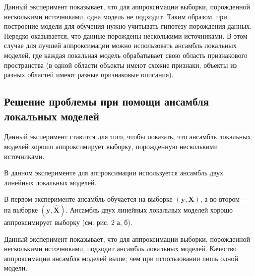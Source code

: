\documentclass[12pt, twoside]{article}
\begin{document}
Данный эксперимент показывает, что для аппроксимации выборки, порожденной несколькими источниками, одна модель не подходит. Таким образом, при построение модели для обучения нужно учитывать гипотезу порождения данных. Нередко оказывается, что данные порождены несколькими источниками. В этом случае для лучшей аппроксимации можно использовать ансамбль локальных моделей, где каждая локальная модель обрабатывает свою область признакового пространства (в одной области объекты имеют схожие признаки, объекты из разных областей имеют разные признаковые описания).

\subsection{Решение проблемы при помощи ансамбля локальных моделей}

Данный эксперимент ставится для того, чтобы показать, что ансамбль локальных моделей хорошо аппроксимирует выборку, порожденную несколькими источниками.


В данном эксперименте для аппроксимации используется ансамбль двух линейных локальных моделей. 

В первом эксперименте ансамбль обучается на выборке $(\mathbf{y}, \mathbf{X})$, а во втором --- на выборке $(\mathbf{y}, \mathbf{\hat{X}})$. Ансамбль двух линейных локальных моделей хорошо аппроксимирует выборку (см. рис. $2$ а, б).  


Данный эксперимент показывает, что для аппроксимации выборки, порожденной несколькими источниками, подходит ансамбль локальных моделей. Качество аппроксимации ансамбля моделей выше, чем при использовании лишь одной модели. 
\end{document}

